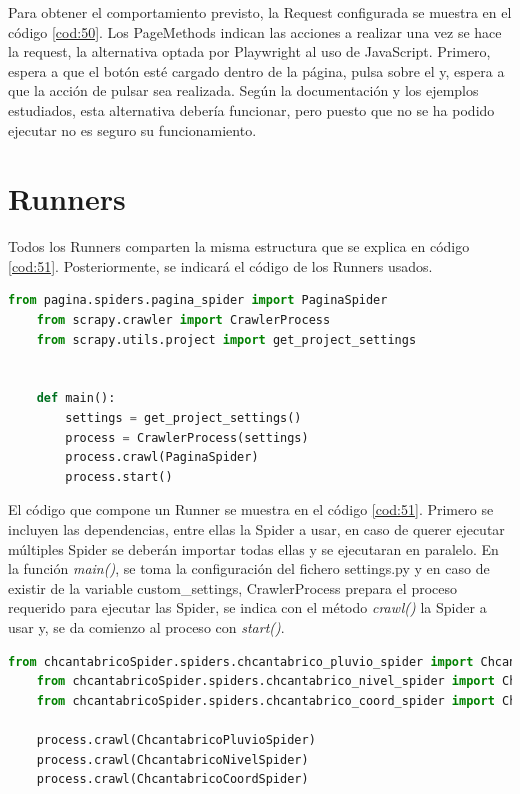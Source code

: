 Para obtener el comportamiento previsto, la Request configurada se muestra en el código \ref{cod:50}. Los PageMethods indican las acciones a realizar una vez se hace la request, la alternativa optada por Playwright al uso de JavaScript. Primero, espera a que el botón esté cargado dentro de la página, pulsa sobre el y, espera a que la acción de pulsar sea realizada. Según la documentación y los ejemplos estudiados, esta alternativa debería funcionar, pero puesto que no se ha podido ejecutar no es seguro su funcionamiento.

\section{Runners}
Todos los Runners comparten la misma estructura que se explica en código \ref{cod:51}. Posteriormente, se indicará el código de los Runners usados.

\begin{lstlisting}[language=Python, caption={Esctructura básica de un Runner}, label=cod:51]
	from pagina.spiders.pagina_spider import PaginaSpider
	from scrapy.crawler import CrawlerProcess
	from scrapy.utils.project import get_project_settings
	
	
	def main():
		settings = get_project_settings()
		process = CrawlerProcess(settings)
		process.crawl(PaginaSpider)
		process.start()
\end{lstlisting}

El código que compone un Runner se muestra en el código \ref{cod:51}. Primero se incluyen las dependencias, entre ellas la Spider a usar, en caso de querer ejecutar múltiples Spider se deberán importar todas ellas y se ejecutaran en paralelo. En la función \textit{main()}, se toma la configuración del fichero settings.py y en caso de existir de la variable custom\_settings, CrawlerProcess prepara el proceso requerido para ejecutar las Spider, se indica con el método \textit{crawl()} la Spider a usar y, se da comienzo al proceso con \textit{start()}.

\begin{lstlisting}[language=Python, caption={CHCantábrico Data Runner}, label=cod:52]
	from chcantabricoSpider.spiders.chcantabrico_pluvio_spider import ChcantabricoPluvioSpider
	from chcantabricoSpider.spiders.chcantabrico_nivel_spider import ChcantabricoNivelSpider
	from chcantabricoSpider.spiders.chcantabrico_coord_spider import ChcantabricoCoordSpider

	process.crawl(ChcantabricoPluvioSpider)
	process.crawl(ChcantabricoNivelSpider)
	process.crawl(ChcantabricoCoordSpider)
\end{lstlisting}

